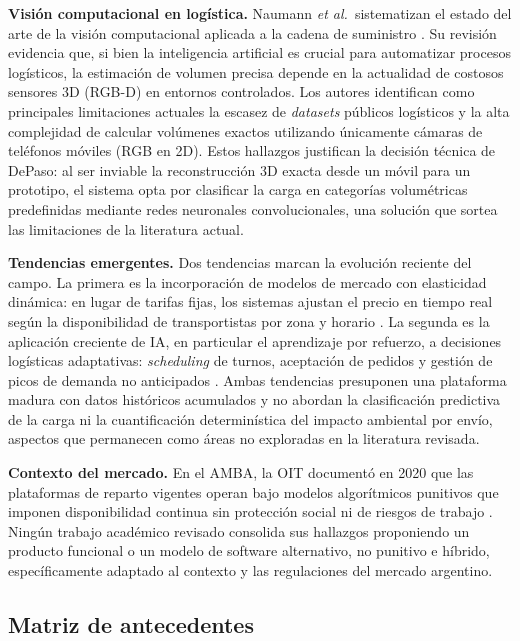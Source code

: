 \textbf{Visión computacional en logística.} Naumann \textit{et al.}\ sistematizan el estado del arte de la visión computacional aplicada a la cadena de suministro \parencite{NaumannEtAl2023}. Su revisión evidencia que, si bien la inteligencia artificial es crucial para automatizar procesos logísticos, la estimación de volumen precisa depende en la actualidad de costosos sensores 3D (RGB-D) en entornos controlados. Los autores identifican como principales limitaciones actuales la escasez de \emph{datasets} públicos logísticos y la alta complejidad de calcular volúmenes exactos utilizando únicamente cámaras de teléfonos móviles (RGB en 2D). Estos hallazgos justifican la decisión técnica de DePaso: al ser inviable la reconstrucción 3D exacta desde un móvil para un prototipo, el sistema opta por clasificar la carga en categorías volumétricas predefinidas mediante redes neuronales convolucionales, una solución que sortea las limitaciones de la literatura actual.

\textbf{Tendencias emergentes.} Dos tendencias marcan la evolución reciente del campo. La primera es la incorporación de modelos de mercado con elasticidad dinámica: en lugar de tarifas fijas, los sistemas ajustan el precio en tiempo real según la disponibilidad de transportistas por zona y horario \parencite{OyamaAkamatsu2024}. La segunda es la aplicación creciente de IA, en particular el aprendizaje por refuerzo, a decisiones logísticas adaptativas: \emph{scheduling} de turnos, aceptación de pedidos y gestión de picos de demanda no anticipados \parencite{SalehEtAl2024}. Ambas tendencias presuponen una plataforma madura con datos históricos acumulados y no abordan la clasificación predictiva de la carga ni la cuantificación determinística del impacto ambiental por envío, aspectos que permanecen como áreas no exploradas en la literatura revisada.

\textbf{Contexto del mercado.} En el AMBA, la OIT documentó en 2020 que las plataformas de reparto vigentes operan bajo modelos algorítmicos punitivos que imponen disponibilidad continua sin protección social ni de riesgos de trabajo \parencite{OIT2020}. Ningún trabajo académico revisado consolida sus hallazgos proponiendo un producto funcional o un modelo de software alternativo, no punitivo e híbrido, específicamente adaptado al contexto y las regulaciones del mercado argentino.

\subsection{Matriz de antecedentes}


